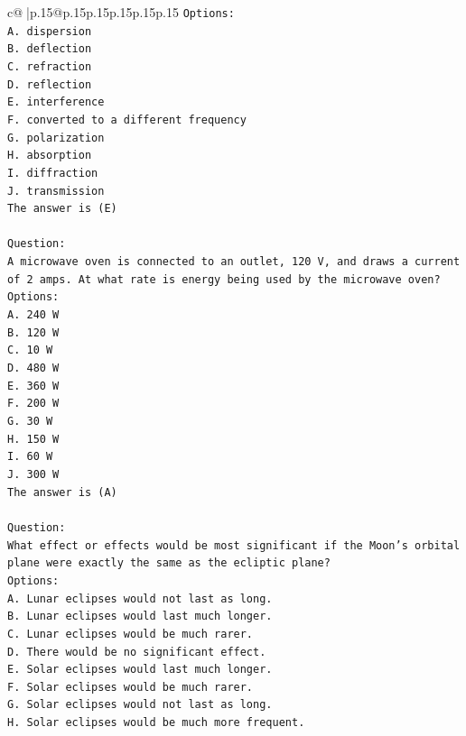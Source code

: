 \documentclass{article}
\begin{document}
{\begin{supertabular}{c@{$\;$}|p{.15\linewidth}@{}p{.15\linewidth}p{.15\linewidth}p{.15\linewidth}p{.15\linewidth}p{.15\linewidth}}
{{{\texttt{Options:} \\
\texttt{A. dispersion} \\
\texttt{B. deflection} \\
\texttt{C. refraction} \\
\texttt{D. reflection} \\
\texttt{E. interference} \\
\texttt{F. converted to a different frequency} \\
\texttt{G. polarization} \\
\texttt{H. absorption} \\
\texttt{I. diffraction} \\
\texttt{J. transmission} \\
\texttt{The answer is (E)} \\
\\ 
\texttt{Question:} \\
\texttt{A microwave oven is connected to an outlet, 120 V, and draws a current of 2 amps. At what rate is energy being used by the microwave oven?} \\
\texttt{Options:} \\
\texttt{A. 240 W} \\
\texttt{B. 120 W} \\
\texttt{C. 10 W} \\
\texttt{D. 480 W} \\
\texttt{E. 360 W} \\
\texttt{F. 200 W} \\
\texttt{G. 30 W} \\
\texttt{H. 150 W} \\
\texttt{I. 60 W} \\
\texttt{J. 300 W} \\
\texttt{The answer is (A)} \\
\\ 
\texttt{Question:} \\
\texttt{What effect or effects would be most significant if the Moon's orbital plane were exactly the same as the ecliptic plane?} \\
\texttt{Options:} \\
\texttt{A. Lunar eclipses would not last as long.} \\
\texttt{B. Lunar eclipses would last much longer.} \\
\texttt{C. Lunar eclipses would be much rarer.} \\
\texttt{D. There would be no significant effect.} \\
\texttt{E. Solar eclipses would last much longer.} \\
\texttt{F. Solar eclipses would be much rarer.} \\
\texttt{G. Solar eclipses would not last as long.} \\
\texttt{H. Solar eclipses would be much more frequent.} \\
            }
        }
    }
     \\ \\


\end{supertabular}}
\end{document}

